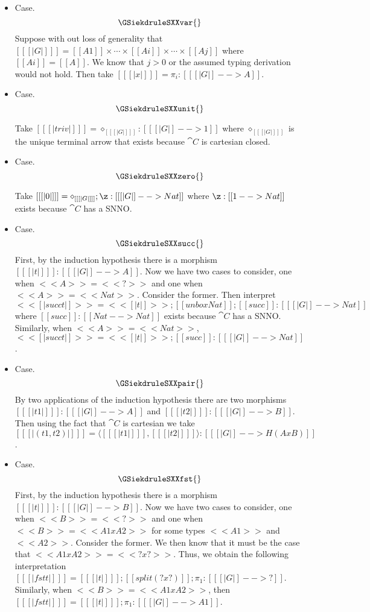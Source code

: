   \begin{itemize} 
  \item[] Case.
    \[
    \GSiekdruleSXXvar{}
    \]
    Suppose with out loss of generality that $[[ [| G |] ]] = [[A1]]
    \times \cdots \times [[Ai]] \times \cdots \times [[Aj]]$ where
    $[[Ai]] = [[A]]$.  We know that $j > 0$ or the assumed typing
    derivation would not hold.  Then take
    $[[ [| x |] ]] = \pi_i : [[ [| G |] --> A]]$.

  \item[] Case.
    \[
    \GSiekdruleSXXunit{}
    \]

    Take $[[ [| triv |] ]] = \diamond_{[[ [| G |] ]]} : [[ [| G |] -->
    1 ]]$ where $\diamond_{[[ [| G |] ]]}$ is the unique terminal
    arrow that exists because $\cat{C}$ is cartesian closed.
    
  \item[] Case.
    \[
    \GSiekdruleSXXzero{}
    \]

    Take $[[ [| 0 |] ]] = \diamond_{[[ [| G |] ]]};\z : [[ [| G |] --> Nat]]$
    where $\z : [[1 --> Nat]]$ exists because $\cat{C}$
    has a SNNO.

  \item[] Case.
    \[
    \GSiekdruleSXXsucc{}
    \]
    First, by the induction hypothesis there is a morphism $[[ [| t |] ]] : [[ [| G |] --> A]]$.
    Now we have two cases to consider, one when $<<A>> = <<?>>$ and one when $<<A>> = <<Nat>>$.
    Consider the former.  Then interpret
    $<< [| succ t |] >> = << [| t |] >>;[[ unbox Nat ]];[[succ]] : [[ [| G |] --> Nat]]$ where
    $[[succ]] : [[Nat --> Nat]]$ exists because $\cat{C}$ has a SNNO.  Similarly,
    when $<<A>> = <<Nat>>$, 
    $<< [| succ t |] >> = << [| t |] >>;[[succ]] : [[ [| G |] --> Nat]]$.
    
  \item[] Case.
    \[
    \GSiekdruleSXXpair{}
    \]
    By two applications of the induction hypothesis there are two morphisms
    $[[ [| t1 |] ]] : [[ [| G |] --> A]]$ and $[[ [| t2 |] ]] : [[ [| G |] --> B]]$.
    Then using the fact that $\cat{C}$ is cartesian we take
    $[[ [| (t1 , t2) |] ]] = \langle [[ [| t1 |] ]] , [[ [| t2 |] ]] \rangle : [[ [| G |] --> H(A x B)]]$.

  \item[] Case.
    \[
    \GSiekdruleSXXfst{}
    \]
    First, by the induction hypothesis there is a morphism $[[ [| t |] ]] : [[ [| G |] --> B]]$.
    Now we have two cases to consider, one when $<<B>> = <<?>>$ and one when $<<B>> = <<A1 x A2>>$
    for some types $<<A1>>$ and $<<A2>>$.  Consider the former.  We then know that it must
    be the case that $<<A1 x A2>> = <<? x ?>>$.  Thus, we obtain the following interpretation
    $[[ [| fst t |] ]] = [[ [| t |] ]];[[split (? x ?)]];\pi_1 : [[ [| G |] --> ?]]$.  Similarly,
    when $<<B>> = <<A1 x A2>>$, then
    $[[ [| fst t |] ]] = [[ [| t |] ]];\pi_1 : [[ [| G |] --> A1]]$.


\end{itemize}

